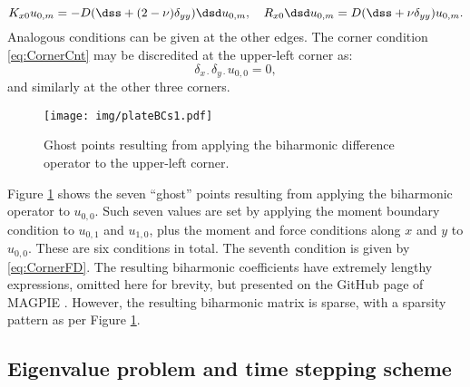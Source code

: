 \begin{equation}
K_{x0}u_{0,m}=-D(\dss + (2-\nu)\delta_{yy})\dsd u_{0,m}, \quad R_{x0}\dsd u_{0,m} = D(\dss + \nu\delta_{yy})u_{0,m}.
\end{equation}
Analogous conditions can be given at the other edges. The corner condition \eqref{eq:CornerCnt} may be discredited at the upper-left corner as:
\begin{equation}\label{eq:CornerFD}
\delta_{x\cdot}\delta_{y\cdot} u_{0,0} = 0,
\end{equation}
and similarly at the other three corners. 
\begin{figure}
\centering
\texttt{[image: img/plateBCs1.pdf]}
\caption{Ghost points resulting from applying the biharmonic difference operator to the upper-left corner.}\label{fig:PlateGhostFD}
\end{figure} 
Figure \ref{fig:PlateGhostFD} shows the seven ``ghost'' points resulting from applying the biharmonic operator to $u_{0,0}$. Such seven values are set by applying the moment boundary condition to $u_{0,1}$ and $u_{1,0}$, plus the moment and force conditions along $x$ and $y$ to $u_{0,0}$. These are six conditions in total. The seventh condition is given by \eqref{eq:CornerFD}. The resulting biharmonic coefficients have extremely lengthy expressions, omitted here for brevity, but presented on the GitHub page of MAGPIE \cite{MAGPIE_project_url}. However, the resulting biharmonic matrix is sparse, with a sparsity pattern as per Figure \ref{fig:PlateGhostFD}.


\subsection{Eigenvalue problem and time stepping scheme}

